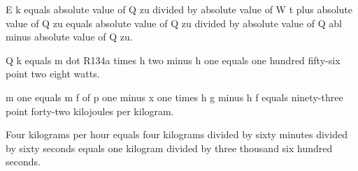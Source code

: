 E k equals absolute value of Q zu divided by absolute value of W t plus absolute value of Q zu equals absolute value of Q zu divided by absolute value of Q abl minus absolute value of Q zu.  

Q k equals m dot R134a times h two minus h one equals one hundred fifty-six point two eight watts.  

m one equals m f of p one minus x one times h g minus h f equals ninety-three point forty-two kilojoules per kilogram.  

Four kilograms per hour equals four kilograms divided by sixty minutes divided by sixty seconds equals one kilogram divided by three thousand six hundred seconds.